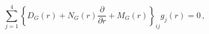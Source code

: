 \begin{equation}
\sum_{j=1}^{4} \left\{ D_G(r) + N_G(r)\frac{\partial}{\partial r} +
M_G(r) \right\}_{ij}g_j(r) = 0 \, ,
\end{equation}


